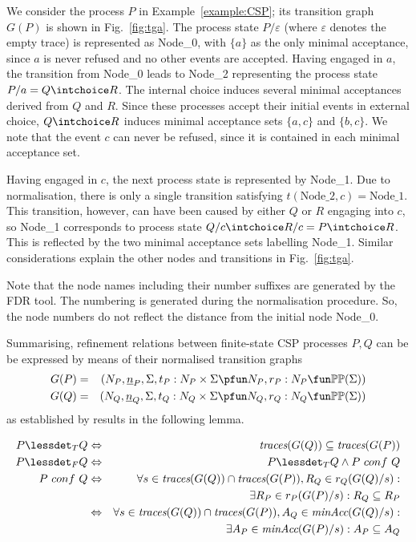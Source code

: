 \begin{example}\label{ex:a}
We consider the process $P$ in Example~\ref{example:CSP}; its transition
graph $G(P)$ is shown in Fig.~\ref{fig:tga}. The process state
$P/\varepsilon$ (where $\varepsilon$ denotes the empty trace) is represented
as Node\_0, with $\{ a\}$ as the only minimal acceptance, since $a$ is never
refused and no other events are accepted. Having engaged in $a$, the
transition from Node\_0 leads to Node\_2 representing the process state $P/a
= Q\intchoice R$. The internal choice induces several minimal acceptances
derived from $Q$ and $R$. Since these processes accept their initial events
in external choice, $Q\intchoice R$ induces minimal acceptance sets $\{a,c\}$
and $\{b,c\}$. We note that the event $c$ can never be refused, since it is
contained in each minimal acceptance set.

Having engaged in $c$, the next process state is represented by Node\_1. Due
to normalisation, there is only a single transition satisfying
$t(\text{Node\_2},c) = \text{Node\_1}$. This transition, however, can have
been caused by either $Q$ or $R$ engaging into $c$, so Node\_1 corresponds to
process state $Q/c \intchoice R/c = P \intchoice R$. This is reflected by the
two minimal acceptance sets labelling Node\_1. Similar considerations explain
the other nodes and transitions in Fig.~\ref{fig:tga}.

Note that the node names including their number suffixes are generated by the
FDR tool. The numbering is generated during the normalisation procedure. So,
the node numbers do not reflect the distance from the initial node Node\_0.
\xbox
\end{example}
%
Summarising, refinement relations between finite-state CSP processes $P, Q$ can be be
expressed by means of their normalised transition graphs
\begin{eqnarray*}
G(P) & = & ( N_P, {\ii n}_P, \Sigma, t_P : N_P\times\Sigma \pfun N_P, r_P : N_P \fun \mathbb{P}\mathbb{P}(\Sigma))
\\
G(Q) & = & ( N_Q, {\ii n}_Q, \Sigma, t_Q : N_Q\times\Sigma \pfun N_Q, r_Q : N_Q \fun \mathbb{P}\mathbb{P}(\Sigma))
\end{eqnarray*}
%
as established by results in the following lemma.
%
\begin{lemma}
  \label{lemma:tgtrcref}
  \begin{eqnarray}
  P \lessdet_T Q & \Leftrightarrow & \trc(G(Q)) \subseteq\trc(G(P))
  \label{eq:trcrefa}
  \\
  \label{eq:failconf}
  P \lessdet_F Q & \Leftrightarrow & P \lessdet_T Q \wedge P\ conf\ Q
  \\
  \label{eq:failrefa}
  P\ conf\ Q & \Leftrightarrow & \nonumber
  \forall s\in\trc(G(Q))\cap \trc(G(P)), R_Q\in r_Q(G(Q)/s):  \nonumber
  \\ & & \tabd
  \exists R_P\in r_P(G(P)/s): R_Q\subseteq R_P
  \\
  \label{eq:failrefb}
   & \Leftrightarrow &
    \forall s\in\trc(G(Q))\cap \trc(G(P)), A_Q\in\minaccs(G(Q)/s):  \nonumber
   \\ & & \tabd
  \exists A_P\in\minaccs(G(P)/s): A_P\subseteq A_Q
 \end{eqnarray}
  \xbox
\end{lemma}
